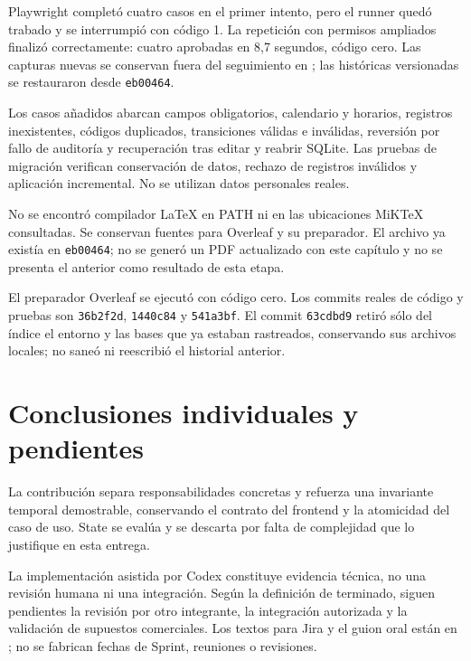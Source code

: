 Playwright completó cuatro casos en el primer intento, pero el runner quedó trabado y se interrumpió con código 1. La repetición con permisos ampliados finalizó correctamente: cuatro aprobadas en 8,7 segundos, código cero. Las capturas nuevas se conservan fuera del seguimiento en ; las históricas versionadas se restauraron desde \texttt{eb00464}.

Los casos añadidos abarcan campos obligatorios, calendario y horarios, registros inexistentes, códigos duplicados, transiciones válidas e inválidas, reversión por fallo de auditoría y recuperación tras editar y reabrir SQLite. Las pruebas de migración verifican conservación de datos, rechazo de registros inválidos y aplicación incremental. No se utilizan datos personales reales.

No se encontró compilador LaTeX en PATH ni en las ubicaciones MiKTeX consultadas. Se conservan fuentes para Overleaf y su preparador. El archivo  ya existía en \texttt{eb00464}; no se generó un PDF actualizado con este capítulo y no se presenta el anterior como resultado de esta etapa.

El preparador Overleaf se ejecutó con código cero. Los commits reales de código y pruebas son \texttt{36b2f2d}, \texttt{1440c84} y \texttt{541a3bf}. El commit \texttt{63cdbd9} retiró sólo del índice el entorno y las bases que ya estaban rastreados, conservando sus archivos locales; no saneó ni reescribió el historial anterior.

\section{Conclusiones individuales y pendientes}
La contribución separa responsabilidades concretas y refuerza una invariante temporal demostrable, conservando el contrato del frontend y la atomicidad del caso de uso. State se evalúa y se descarta por falta de complejidad que lo justifique en esta entrega.

La implementación asistida por Codex constituye evidencia técnica, no una revisión humana ni una integración. Según la definición de terminado, siguen pendientes la revisión por otro integrante, la integración autorizada y la validación de supuestos comerciales. Los textos para Jira y el guion oral están en ; no se fabrican fechas de Sprint, reuniones o revisiones.

\endgroup
